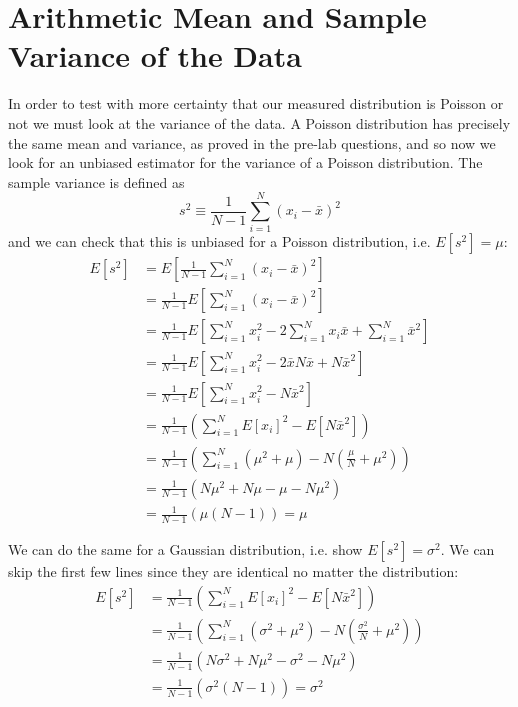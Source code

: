 \documentclass[12pt]{article}
\numberwithin{equation}{section}
\numberwithin{figure}{section}
\numberwithin{table}{section}
\begin{document}
\section{Arithmetic Mean and Sample Variance of the Data}\label{sec:Sample Variance}
\par In order to test with more certainty that our measured distribution is Poisson or not we must look at the variance of the data. A Poisson distribution has precisely the same mean and variance, as proved in the pre-lab questions, and so now we look for an unbiased estimator for the variance of a Poisson distribution. The sample variance is defined as 
\begin{equation}
    s^2\equiv\frac{1}{N-1}\sum_{i=1}^N (x_i-\bar{x})^2
    \label{eqn:Sample Variance}
\end{equation}
and we can check that this is unbiased for a Poisson distribution, i.e. $E[s^2]=\mu$:
\begin{align*}
    E[s^2]&=E\left[\frac{1}{N-1}\sum_{i=1}^N (x_i-\bar{x})^2\right]\\
    &=\frac{1}{N-1}E\left[\sum_{i=1}^N (x_i-\bar{x})^2\right]\\
    &=\frac{1}{N-1}E\left[\sum_{i=1}^N x_i^2 -2\sum_{i=1}^N x_i\bar{x} + \sum_{i=1}^N \bar{x}^2\right]\\
    &=\frac{1}{N-1}E\left[\sum_{i=1}^N x_i^2-2\bar{x}N\bar{x}+N\bar{x}^2\right]\\
    &=\frac{1}{N-1}E\left[\sum_{i=1}^N x_i^2-N\bar{x}^2\right]\\
    &=\frac{1}{N-1}\left(\sum_{i=1}^N E[x_i]^2-E[N\bar{x}^2]\right)\\
    &=\frac{1}{N-1}\left(\sum_{i=1}^N(\mu^2+\mu)-N\left(\frac{\mu}{N}+\mu^2\right)\right)\\
    &=\frac{1}{N-1}(N\mu^2+N\mu-\mu-N\mu^2)\\
    &=\frac{1}{N-1}(\mu(N-1))=\mu
\end{align*}
\par We can do the same for a Gaussian distribution, i.e. show $E[s^2]=\sigma^2$. We can skip the first few lines since they are identical no matter the distribution:
\begin{align*}
    E[s^2]&=\frac{1}{N-1}\left(\sum_{i=1}^N E[x_i]^2-E[N\bar{x}^2]\right)\\
    &=\frac{1}{N-1}\left(\sum_{i=1}^N (\sigma^2+\mu^2) -N\left(\frac{\sigma^2}{N}+\mu^2\right)\right)\\
    &=\frac{1}{N-1}(N\sigma^2+N\mu^2-\sigma^2-N\mu^2)\\
    &=\frac{1}{N-1}(\sigma^2(N-1))=\sigma^2
\end{align*}
\end{document}
